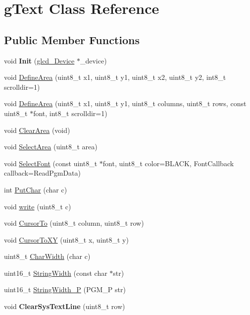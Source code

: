 \hypertarget{classg_text}{
\section{gText Class Reference}
\label{classg_text}
}
\subsection*{Public Member Functions}
\begin{DoxyCompactItemize}
\item 
\hypertarget{classg_text_a41b4390adf51c17094b40fa1080ccc7c}{
void {\bfseries Init} (\hyperlink{classglcd___device}{glcd\_\-Device} $\ast$\_\-device)}
\label{classg_text_a41b4390adf51c17094b40fa1080ccc7c}

\item 
void \hyperlink{classg_text_a8bc94b15c7864ef34491e8ef5681bfd4}{DefineArea} (uint8\_\-t x1, uint8\_\-t y1, uint8\_\-t x2, uint8\_\-t y2, int8\_\-t scrolldir=1)
\item 
void \hyperlink{classg_text_a99a194bcdd6f57e27752da45a8cf4a86}{DefineArea} (uint8\_\-t x1, uint8\_\-t y1, uint8\_\-t columns, uint8\_\-t rows, const uint8\_\-t $\ast$font, int8\_\-t scrolldir=1)
\item 
void \hyperlink{classg_text_a8918c2e7b5b1121a6c9051db049c85bf}{ClearArea} (void)
\item 
void \hyperlink{classg_text_a3d2fcd1f48b1e44611b7cf6fb2bae5db}{SelectArea} (uint8\_\-t area)
\item 
void \hyperlink{classg_text_a400107517f9f5fa106b692d1c15165d0}{SelectFont} (const uint8\_\-t $\ast$font, uint8\_\-t color=BLACK, FontCallback callback=ReadPgmData)
\item 
int \hyperlink{classg_text_a368fbed0d50735647595f2d12cbe167c}{PutChar} (char c)
\item 
void \hyperlink{classg_text_a7f537bfce982c46779f61321df66b018}{write} (uint8\_\-t c)
\item 
void \hyperlink{classg_text_a7ce5b6e29b0d26d85064e6235927af75}{CursorTo} (uint8\_\-t column, uint8\_\-t row)
\item 
void \hyperlink{classg_text_a299ea80c33b47ffc1043e472d48d670d}{CursorToXY} (uint8\_\-t x, uint8\_\-t y)
\item 
uint8\_\-t \hyperlink{classg_text_a6cb49e22a690752ea439e2773ae31ec1}{CharWidth} (char c)
\item 
uint16\_\-t \hyperlink{classg_text_a0dce9ad4c40e0d8b0487f4d2303bd8ef}{StringWidth} (const char $\ast$str)
\item 
uint16\_\-t \hyperlink{classg_text_ae6f8d92ff8240dee9e32f74b1cbff44a}{StringWidth\_\-P} (PGM\_\-P str)
\item 
\hypertarget{classg_text_a0012b4b875489197faba124f8670b68a}{
void {\bfseries ClearSysTextLine} (uint8\_\-t row)}
\label{classg_text_a0012b4b875489197faba124f8670b68a}

\end{DoxyCompactItemize}
